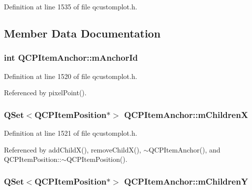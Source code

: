 Definition at line 1535 of file qcustomplot.\+h.



\subsection{Member Data Documentation}
\hypertarget{class_q_c_p_item_anchor_a00c62070333e8345976b579676ad3997}{}
\subsubsection[{m\+Anchor\+Id}]{\setlength{\rightskip}{0pt plus 5cm}int Q\+C\+P\+Item\+Anchor\+::m\+Anchor\+Id\hspace{0.3cm}{\ttfamily [protected]}}\label{class_q_c_p_item_anchor_a00c62070333e8345976b579676ad3997}


Definition at line 1520 of file qcustomplot.\+h.



Referenced by pixel\+Point().

\hypertarget{class_q_c_p_item_anchor_a3c0bfd6e50f3b48e2a9b3824695b20f7}{}
\subsubsection[{m\+Children\+X}]{\setlength{\rightskip}{0pt plus 5cm}Q\+Set$<${\bf Q\+C\+P\+Item\+Position}$\ast$$>$ Q\+C\+P\+Item\+Anchor\+::m\+Children\+X\hspace{0.3cm}{\ttfamily [protected]}}\label{class_q_c_p_item_anchor_a3c0bfd6e50f3b48e2a9b3824695b20f7}


Definition at line 1521 of file qcustomplot.\+h.



Referenced by add\+Child\+X(), remove\+Child\+X(), $\sim$\+Q\+C\+P\+Item\+Anchor(), and Q\+C\+P\+Item\+Position\+::$\sim$\+Q\+C\+P\+Item\+Position().

\hypertarget{class_q_c_p_item_anchor_a3abe4eebd0683454d81c8341df6f7115}{}
\subsubsection[{m\+Children\+Y}]{\setlength{\rightskip}{0pt plus 5cm}Q\+Set$<${\bf Q\+C\+P\+Item\+Position}$\ast$$>$ Q\+C\+P\+Item\+Anchor\+::m\+Children\+Y\hspace{0.3cm}{\ttfamily [protected]}}\label{class_q_c_p_item_anchor_a3abe4eebd0683454d81c8341df6f7115}


